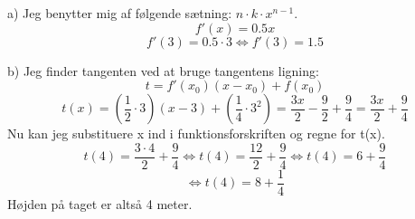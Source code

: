 a)
Jeg benytter mig af følgende sætning: $n\cdot k\cdot x^{n-1}$.
$$f'(x)=0.5x$$
$$f'(3)=0.5\cdot 3\Longleftrightarrow f'(3)=1.5$$

b)
Jeg finder tangenten ved at bruge tangentens ligning:
$$t=f'(x_{0})(x-x_{0})+f(x_{0})$$
$$t(x)=(\frac{1}{2}\cdot 3)(x-3)+(\frac{1}{4}\cdot 3^2)=\frac{3x}{2}-\frac{9}{2}+\frac{9}{4}=\frac{3x}{2}+\frac{9}{4}$$
Nu kan jeg substituere x ind i funktionsforskriften og regne for t(x).
$$t(4)=\frac{3\cdot4}{2} + \frac{9}{4}\Longleftrightarrow t(4)=\frac{12}{2}+\frac{9}{4}\Longleftrightarrow t(4)=6+\frac{9}{4}$$
$$ \Longleftrightarrow t(4)=8+\frac{1}{4}$$
Højden på taget er altså 4 meter.\newline

